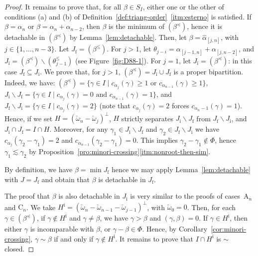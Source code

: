 \documentclass[ALCO,published]{cedram}
\theoremstyle{plain}
\newcommand\wh{\widehat}
\newcommand\smeno{\smallsetminus}
\newcommand\al{\alpha}
\newcommand\be{\beta}
\newcommand\ga{\gamma}
\newcommand\preq{\preccurlyeq}
\renewcommand{\leq}{\leqslant}
\begin{document}
\begin{proof}
\par
It remains to prove that, for all $\be\in S_I$, either one or the other of conditions (a) and (b) of Definition~\ref{def:triang-order}~\ref{itm:esterno} is satisfied.
If $\be=\al_n$ or $\be=\al_{n}+\al_{n-2}$, then $\be$ is the minimum of $(\be^\preq)$, hence it is detachable in  $(\be^\preq)$ by  Lemma~\ref{lem:detachable}. 
Then, let $\be=\wh\al_{[j,n]}$, with $j\in\{1,\dots,n-3\}$.
Let $J_{\mathrm f}=(\be^\leq)$. 
For $j>1$, let $\theta_{j-i}=\al_{[j-1,n]}+\al_{[j,n-2]}$, and $J_{\mathrm i}=(\be^\preq)\smeno (\theta_{j-1}^\leq) $ (see Figure~\ref{fig:D88-1}). 
For $j=1$, let  $J_{\mathrm i}=(\be^\preq)$: in this case $J_{\mathrm f}\subseteq J_{\mathrm i}$.
We prove that, for $j>1$,  $(\be^\preq)=J_{\mathrm i}\cup J_{\mathrm f}$ is a proper bipartition.
Indeed, we have: $(\be^\preq)=\{\ga\in I\mid c_{\al_j}(\ga)\geq 1 \text { or }  c_{\al_{n-1}}(\ga)\geq 1\}$, $J_{\mathrm i}\smeno J_{\mathrm f}=\{\ga\in I\mid c_{\al_j}(\ga)=0 \text{ and } c_{\al_{n-1}}(\ga)=1\}$, and $J_{\mathrm f}\smeno J_{\mathrm i}=\{\ga\in I\mid c_{\al_j}(\ga)=2\}$ (note that $c_{\al_j}(\ga)=2$ forces $c_{\al_n-1}(\ga)=1$). 
Hence, if we set $H=(\check\omega_n-\check\omega_j)^\perp$, $H$ strictly separates $J_{\mathrm i}\smeno J_{\mathrm f}$ from $J_{\mathrm f}\smeno J_{\mathrm i}$, and $J_{\mathrm i}\cap J_{\mathrm f}=I\cap H$. 
Moreover, for any $\ga_1\in J_{\mathrm i}\smeno J_{\mathrm f}$ and $\ga_2\in J_{\mathrm f}\smeno J_{\mathrm i}$ we have $c_{\al_j}(\ga_2-\ga_1)=2$ and $c_{\al_{n-1}}(\ga_2-\ga_1)=0$. 
This implies $\ga_2-\ga_1\not\in \Phi$, hence  $\ga_1\lesssim \ga_2$ by Proposition~\ref{pro:minori-crossing}\ref{itm:nonroot-then-sim}.
\par 
By  definition, we have $\be=\min J_\mathrm f$ hence we may apply Lemma~\ref{lem:detachable} with $J=J_{\mathrm f}$ and obtain that $\be$ is detachable in $J_\mathrm f$.
\enlargethispage{10cm}%
\par
The proof that $\be$ is also detachable in  $J_{\mathrm i}$ is very similar to the proofs of cases~$\mathrm A_{n}$ and $\mathrm C_n$.
We take  $H^{\mathrm i} =(\check\omega_n-\check\omega_{n-1}-\check\omega_{j-1})^\perp$, with $\check\omega_{0}=0$. 
Then, for each $\ga\in(\be^\preq)$, if $\ga\notin H^{\mathrm i}$ and $\ga\neq \be$, we have $\ga> \be$ and $(\ga, \be)=0$. 
If $\ga\in H^{\mathrm i}$, then either $\ga$ is incomparable with $\be$, or $\ga-\be\in \Phi$. 
Hence, by Corollary~\ref{cor:minori-crossing}, $\ga\sim\be$ if and only if $\ga\not\in H^{\mathrm i}$. 
It remains to prove that $I\cap H^{\mathrm i}$ is $\sim$closed.

\end{proof}
\end{document}
